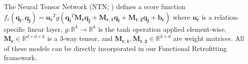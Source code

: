 \documentclass[11pt, a4paper]{article}
\begin{document}


The Neural Tensor Network (NTN; ) defines a score function $f_r(\boldsymbol{q_i}, \boldsymbol{q_j}) = \boldsymbol{u_r}^Tg(\boldsymbol{q_i}^T\boldsymbol{M_r}\boldsymbol{q_j} + \boldsymbol{M_{r,1}}\boldsymbol{q_i} + \boldsymbol{M_{r,2}}\boldsymbol{q_j} + \boldsymbol{b_r})$ 
where $\boldsymbol{u_r}$ is a relation-specific linear layer, $g: \mathbb{R}^{k}\rightarrow \mathbb{R}^{k}$ is the tanh operation applied element-wise, $\boldsymbol{M_r} \in \mathbb{R}^{d\times d\times k}$ is a 3-way tensor, and $\boldsymbol{M_{r,1}},\boldsymbol{M_{r,2}} \in \mathbb{R}^{k\times d}$ are weight matrices. All of these models can be directly incorporated in our Functional Retrofitting framework.%
\end{document}
